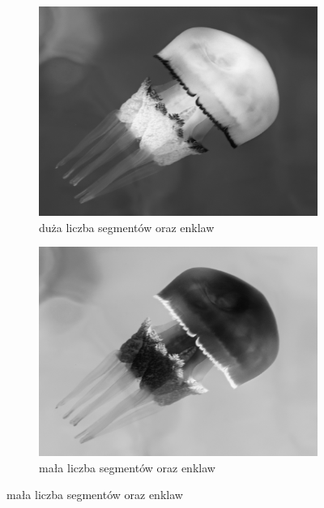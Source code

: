 \documentclass[a4paper, 12pt, polish, twoside]{extreport}
\begin{document}
        \begin{figure}[H] 
        \centering
        \begin{subfigure}{0.31\textwidth}
            \centering
            \includegraphics[width = \textwidth]{img/2-theory/10-jellyfish.png}
            \caption{duża liczba segmentów oraz enklaw}
            \label{theory-technics-contrast-jellyfish-a}
        \end{subfigure}
        \begin{subfigure}{0.31\textwidth}
            \centering
            \includegraphics[width = \textwidth]{img/2-theory/10-inv-jellyfish.png}
            \caption{mała liczba segmentów oraz enklaw}
            \label{theory-technics-contrast-jellyfish-b}

\end{subfigure}
\end{figure}
\end{document}
